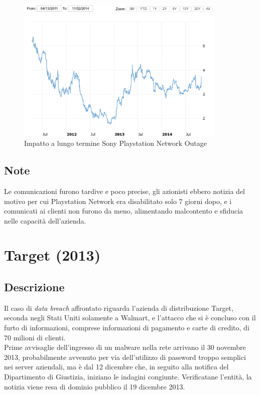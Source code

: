\documentclass[12pt,a4paper,openright,twoside]{report}
\begin{document}
\begin{figure}[H] 
\begin{center} 
\includegraphics[width=10cm]{figures/sony_2011_longTerm.png} 
\caption[Grafico Sony PSN long]{Impatto a lungo termine Sony Playstation Network Outage}\label{fig:pnt2}
\end{center}
\end{figure}


\subsection{Note}
Le comunicazioni furono tardive e poco precise, gli azionisti ebbero notizia del motivo per cui Playstation Network era disabilitato solo 7 giorni dopo, e i comunicati ai clienti non furono da meno, alimentando malcontento e sfiducia nelle capacit\`a dell'azienda\cite{Sony_pnt}.
\section{Target (2013)}
\subsection{Descrizione}
Il caso di \textit{data breach} affrontato riguarda l'azienda di distribuzione Target, seconda negli Stati Uniti solamente a Walmart, e l'attacco che si \`e concluso con il furto di  informazioni, comprese informazioni di pagamento e carte di credito, di 70 milioni di clienti.\\
Prime avvisaglie dell'ingresso di un malware nella rete arrivano il 30 novembre 2013, probabilmente avvenuto per via dell'utilizzo di password troppo semplici nei server aziendali, ma \`e dal 12 dicembre che, in seguito alla notifica del Dipartimento di Giustizia, iniziano le indagini congiunte. Verificatane l'entit\`a, la notizia viene resa di dominio pubblico il 19 dicembre 2013\cite{Target}.\\
\end{document}
